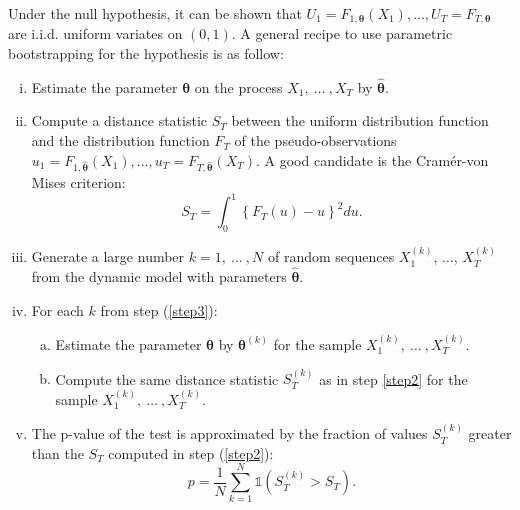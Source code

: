 Under the null hypothesis, it can be shown that $U_1 =
F_{1,\mathbf{\theta}}(X_1),\ldots, U_T =F_{T,\mathbf{\theta}}$ are
i.i.d. uniform variates on $(0,1)$.
A general recipe to use parametric bootstrapping for the hypothesis is as follow:
\begin{enumerate}[(i)]
\item \label{step1} Estimate the parameter $\mathbf{\theta}$ on the process $X_{1}, \ \ldots \ ,X_{T}$ by $\hat{\mathbf{\theta}}$.
\item \label{step2} Compute a distance statistic $S_T$ between the uniform distribution function and the distribution function $F_T$ of the pseudo-observations
$u_1 = F_{1,\hat{\mathbf{\theta}}}(X_1),\ldots, u_T
=F_{T,\hat{\mathbf{\theta}}}(X_T)$. A good candidate is the
Cram\'er-von Mises criterion:
\begin{displaymath}
S_T= \int_0^1 \left\{F_T(u)-u\right\}^2 du.
\end{displaymath}
\item \label{step3} Generate a large number $k=1, \ \ldots \ ,N$ of random sequences
$X_{1}^{(k)}$, $\ldots$, $X_{T}^{(k)}$ from the dynamic model with
parameters $\hat{\mathbf{\theta}}$.
\item For each $k$ from step (\ref{step3}):
\begin{enumerate}[(a)]
\item Estimate the parameter $\mathbf{\theta}$ by $\mathbf{\theta}^{(k)}$ for the sample  $X_{1}^{(k)}, \ \ldots \ ,X_{T}^{(k)}$.
\item Compute the same distance statistic $S_T^{(k)}$ as in step
\eqref{step2} for the sample $X_{1}^{(k)}, \ \ldots \ ,X_{T}^{(k)}$.

\end{enumerate}
\item The p-value of the test is approximated by the fraction of values $S_T^{(k)}$
greater than the $S_T$ computed in step (\ref{step2}):
\begin{displaymath}
p=\frac{1}{N} \sum_{k=1}^N \mathds{1}\left(S_T^{(k)}>S_T\right).
\end{displaymath}
\end{enumerate}

